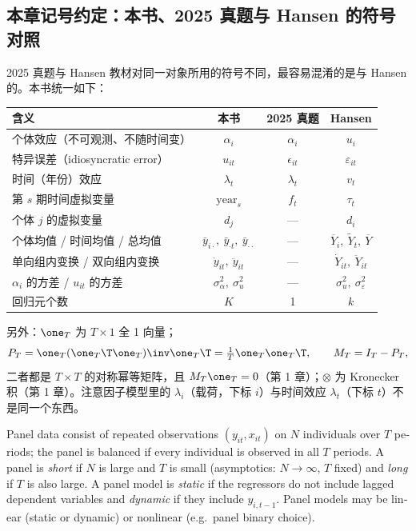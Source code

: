 \subsection{本章记号约定：本书、2025 真题与 Hansen 的符号对照}

2025 真题与 Hansen 教材对同一对象所用的符号不同，最容易混淆的是与 Hansen 的。本书统一如下：

\begin{center}\begin{minipage}{\linewidth}\centering
{}
\small
\begin{tabularx}{\linewidth}{Lccc}
\toprule
含义 & 本书 & 2025 真题 & Hansen \\
\midrule
个体效应（不可观测、不随时间变） & $\alpha_i$ & $\alpha_i$ & $u_i$\\
特异误差（idiosyncratic error） & $u_{it}$ & $\epsilon_{it}$ & $\varepsilon_{it}$\\
时间（年份）效应 & $\lambda_t$ & $\lambda_t$ & $v_t$\\
第 $s$ 期时间虚拟变量 & $\text{year}_s$ & $f_t$ & $\tau_t$\\
个体 $j$ 的虚拟变量 & $d_j$ & — & $d_i$\\
个体均值 / 时间均值 / 总均值 & $\bar y_{i\cdot},\ \bar y_{\cdot t},\ \bar y_{\cdot\cdot}$ & — & $\overline{Y}_i,\ \widetilde{Y}_t,\ \overline{Y}$\\
单向组内变换 / 双向组内变换 & $\dot y_{it},\ \ddot y_{it}$ & — & $\dot Y_{it},\ \ddot Y_{it}$\\
$\alpha_i$ 的方差 / $u_{it}$ 的方差 & $\sigma_\alpha^2,\ \sigma_u^2$ & — & $\sigma_u^2,\ \sigma_\varepsilon^2$\\
回归元个数 & $K$ & 1 & $k$\\
\bottomrule
\end{tabularx}
\end{minipage}\end{center}

另外：$\one_T$ 为 $T\times1$ 全 1 向量；
\[
P_T=\one_T(\one_T\T\one_T)\inv\one_T\T=\tfrac1T\one_T\one_T\T,\qquad M_T=I_T-P_T,
\]
二者都是 $T\times T$ 的对称幂等矩阵，且 $M_T\one_T=0$（第 1 章）；$\otimes$ 为 Kronecker 积（第 1 章）。注意因子模型里的 $\lambda_i$（载荷，下标 $i$）与时间效应 $\lambda_t$（下标 $t$）不是同一个东西。

\begin{english}
Panel data consist of repeated observations $(y_{it},x_{it})$ on $N$ individuals over $T$ periods; the panel is balanced if every individual is observed in all $T$ periods. A panel is \emph{short} if $N$ is large and $T$ is small (asymptotics: $N\to\infty$, $T$ fixed) and \emph{long} if $T$ is also large. A panel model is \emph{static} if the regressors do not include lagged dependent variables and \emph{dynamic} if they include $y_{i,t-1}$. Panel models may be linear (static or dynamic) or nonlinear (e.g.\ panel binary choice).
\end{english}


